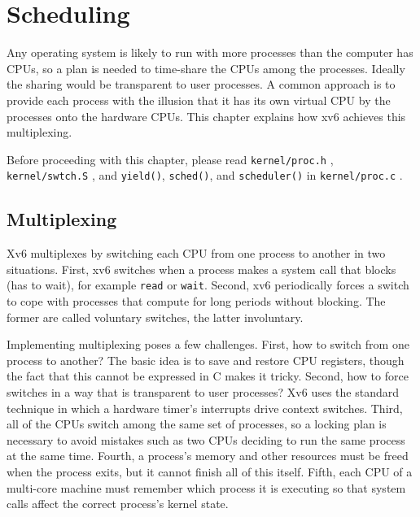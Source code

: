 % 
%  
\chapter{Scheduling}
\label{CH:SCHED}

Any operating system is likely to run with more processes than the
computer has CPUs, so a plan is needed to time-share the
CPUs among the processes. Ideally the sharing would be transparent to user
processes.  A common approach is to provide each process
with the illusion that it has its own virtual CPU by
the processes onto the hardware CPUs.
This chapter explains how xv6 achieves this multiplexing.

Before proceeding with this chapter, please read \lstinline{kernel/proc.h} ,
\lstinline{kernel/swtch.S} ,
and
{\tt yield()},
{\tt sched()},
and
{\tt scheduler()}
in \lstinline{kernel/proc.c} .

\section{Multiplexing}

Xv6 multiplexes by switching each CPU from one process to
another in two situations. First, xv6
switches when a process makes a system
call that blocks (has to wait), for example \lstinline{read} or
\lstinline{wait}.
Second, xv6 periodically forces a switch to cope with
processes that compute for long periods without blocking.
The former are called voluntary switches,
the latter involuntary.

Implementing multiplexing poses a few challenges. First, how to switch from one
process to another? 
The basic idea is to save and restore CPU registers,
though the fact that this cannot be expressed in C makes it tricky.
Second, how to force
switches in a way that is transparent to user processes?  Xv6 uses the
standard technique in which a hardware timer's interrupts drive context switches.
Third, all of the CPUs switch among the same set of processes, so a
locking plan is necessary to avoid mistakes such as two CPUs deciding
to run the same process at the same time. Fourth, a process's
memory and other resources must be freed when the process exits,
but it cannot finish all of this itself.
Fifth, each CPU of a multi-core machine must remember which
process it is executing so that system calls affect the correct
process's kernel state.

